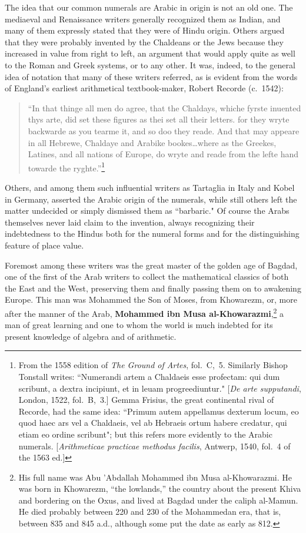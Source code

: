 \documentclass[11pt,a4paper]{article}
\begin{document}
The idea that our common numerals are Arabic in origin is not an old one. The mediaeval and Renaissance writers generally recognized them as Indian, and many of them expressly stated that they were of Hindu origin. Others argued that they were probably invented by the Chaldeans or the Jews because they increased in value from right to left, an argument that would apply quite as well to the Roman and Greek systems, or to any other. It was, indeed, to the general idea of notation that many of these writers referred, as is evident from the words of England's earliest arithmetical textbook-maker, Robert Recorde (c.~1542):

\begin{quote}
``In that thinge all men do agree, that the Chaldays, whiche fyrste inuented thys arte, did set these figures as thei set all their letters. for they wryte backwarde as you tearme it, and so doo they reade. And that may appeare in all Hebrewe, Chaldaye and Arabike bookes\ldots where as the Greekes, Latines, and all nations of Europe, do wryte and reade from the lefte hand towarde the ryghte.''\footnote{From the 1558 edition of \textit{The Ground of Artes}, fol.~C,~5. Similarly Bishop Tonstall writes: ``Numerandi artem a Chaldaeis esse profectam: qui dum scribunt, a dextra incipiunt, et in leuam progreediuntur." [\textit{De arte supputandi}, London, 1522, fol.~B,~3.] Gemma Frisius, the great continental rival of Recorde, had the same idea: ``Primum autem appellamus dexterum locum, eo quod haec ars vel a Chaldaeis, vel ab Hebraeis ortum habere credatur, qui etiam eo ordine scribunt"; but this refers more evidently to the Arabic numerals. [\textit{Arithmeticae practicae methodus facilis}, Antwerp, 1540, fol.~4 of the 1563 ed.]}
\end{quote}

Others, and among them such influential writers as Tartaglia in Italy and Kobel in Germany, asserted the Arabic origin of the numerals, while still others left the matter undecided or simply dismissed them as ``barbaric." Of course the Arabs themselves never laid claim to the invention, always recognizing their indebtedness to the Hindus both for the numeral forms and for the distinguishing feature of place value.

Foremost among these writers was the great master of the golden age of Bagdad, one of the first of the Arab writers to collect the mathematical classics of both the East and the West, preserving them and finally passing them on to awakening Europe. This man was Mohammed the Son of Moses, from Khowarezm, or, more after the manner of the Arab, \textbf{Mohammed ibn Musa al-Khowarazmi},\footnote{His full name was Abu 'Abdallah Mohammed ibn Musa al-Khowarazmi. He was born in Khowarezm, ``the lowlands,'' the country about the present Khiva and bordering on the Oxus, and lived at Bagdad under the caliph al-Mamun. He died probably between 220 and 230 of the Mohammedan era, that is, between 835 and 845 a.d., although some put the date as early as 812.} a man of great learning and one to whom the world is much indebted for its present knowledge of algebra and of arithmetic.
\end{document}
